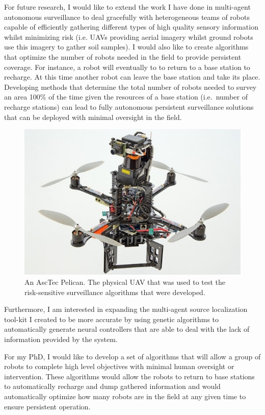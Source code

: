\documentclass{article}
\begin{document}
For future research, I would like to extend the work I have done in multi-agent
autonomous surveillance to deal gracefully with heterogeneous teams of robots
capable of efficiently gathering different types of high quality sensory
information whilst minimizing risk (i.e. UAVs providing aerial imagery whilst
ground robots use this imagery to gather soil samples). I would also like to
create algorithms that optimize the number of robots needed in the field to
provide persistent coverage. For instance, a robot will eventually to to return
to a base station to recharge. At this time another robot can leave the base
station and take its place. Developing methods that determine the total number
of robots needed to survey an area 100\% of the time given the resources of a
base station (i.e.\ number of recharge stations) can lead to fully autonomous
persistent surveillance solutions that can be deployed with minimal oversight
in the field.

\begin{figure}[h!]

    \centering

    \includegraphics[width=0.6\linewidth]{figs/bird}

    \caption{An AscTec Pelican. The physical UAV that was used to test the
    risk-sensitive surveillance algorithms that were developed.}

\end{figure}

Furthermore, I am interested in expanding the multi-agent source localization
tool-kit I created to be more accurate by using genetic algorithms to
automatically generate neural controllers that are able to deal with the lack
of information provided by the system.

For my PhD, I would like to develop a set of algorithms that will allow a group
of robots to complete high level objectives with minimal human oversight or
intervention. These algorithms would allow the robots to return to base
stations to automatically recharge and dump gathered information and would
automatically optimize how many robots are in the field at any given time to
ensure persistent operation.

 
\end{document}
